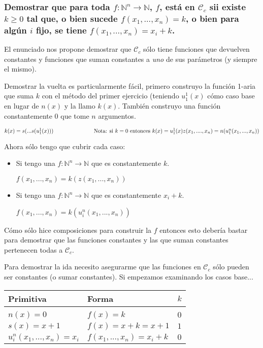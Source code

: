 \documentclass[11pt]{article} %
\newcommand{\desarrollo}[1]{

    \hspace{2em}
    \begin{minipage}{\textwidth}
        #1
    \end{minipage}

}
\newcommand{\nat}{\mathbb{N}}
\newcommand{\Ccur}{\mathcal{C}}
\begin{document}
\subsubsection{Demostrar que para toda $f: \nat^n \to \nat$, $f$, está en $\Ccur_c$ sii existe $k \geq 0$ tal que, o bien sucede $f(x_1, ..., x_n) = k$, o bien para algún $i$ fijo, se tiene $f(x_1, ..., x_n) = x_i + k$.}

El enunciado nos propone demostrar que $\Ccur_c$ sólo tiene funciones que devuelven constantes y funciones que suman constantes a \emph{uno} de sus parámetros (y siempre el mismo).

Demostrar la vuelta es particularmente fácil, primero construyo la función 1-aria que suma $k$ con el método del primer ejercicio (teniendo $u^1_1(x)$ cómo caso base en lugar de $n(x)$ y la llamo $k(x)$. También construyo una función constantemente 0 que tome $n$ argumentos.
\desarrollo{$
k(x) = s(...s(u^1_1(x))) \text{\hspace{7em} Nota: si $k=0$ entonces } k(x)=u^1_1(x) \\
z(x_1, ...., x_n) = n(u^n_1(x_1, ..., x_n))
$}

Ahora sólo tengo que cubrir cada caso:
\begin{itemize}
\item Si tengo una $f: \nat^n \to \nat$ que es constantemente $k$.
\desarrollo{$ f(x_1, ..., x_n) = k(z(x_1, ..., x_n)) $}
\item Si tengo una $f: \nat^n \to \nat$ que es constantemente $x_i + k$.
\desarrollo{$ f(x_1, ..., x_n) = k(u^n_i(x_1,...,x_n)) $}
\end{itemize}

Cómo sólo hice composiciones para construir la $f$ entonces esto debería bastar para demostrar que las funciones constantes y las que suman constantes pertenecen todas a $\Ccur_c$.

Para demostrar la ida necesito asegurarme que las funciones en $\Ccur_c$ sólo pueden ser constantes (o sumar constantes). Si empezamos examinando los casos base...
\desarrollo{
\begin{tabular}{lll}
Primitiva                  & Forma                        & $k$ \\ \hline \\[-1em]
$n(x)=0$                   & $f(x) = k$                   & $0$ \\
$s(x)=x+1$                 & $f(x) = x + k = x + 1$       & $1$ \\
$u^n_i(x_1, ..., x_n)=x_i$ & $f(x_1, ..., x_n) = x_i + k$ & $0$
\end{tabular}
}
\end{document}
